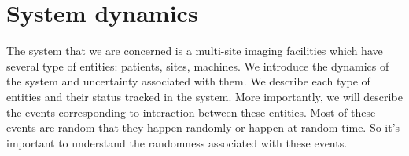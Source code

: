\section{System dynamics}

The system that we are concerned is a multi-site imaging facilities which have several type of entities: patients, sites, machines. We introduce the dynamics of the system and uncertainty associated with them. We describe each type of entities and their status tracked in the system. More importantly, we will describe the events corresponding to interaction between these entities. Most of these events are random that they happen randomly or happen at random time. So it's important to understand the randomness associated with these events.




